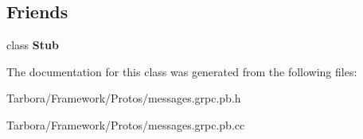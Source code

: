 \subsection*{Friends}
\begin{DoxyCompactItemize}
\item 
\mbox{\label{classtbMessages_1_1TarboraMessages_1_1Stub_1_1experimental__async_a83cdea49df0bc777f54453927d691680}} 
class {\bfseries Stub}
\end{DoxyCompactItemize}


The documentation for this class was generated from the following files\+:\begin{DoxyCompactItemize}
\item 
Tarbora/\+Framework/\+Protos/messages.\+grpc.\+pb.\+h\item 
Tarbora/\+Framework/\+Protos/messages.\+grpc.\+pb.\+cc\end{DoxyCompactItemize}
